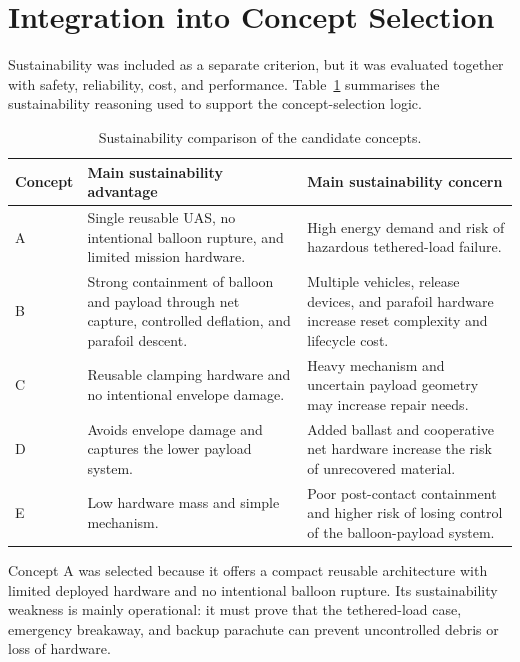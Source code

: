 \section{Integration into Concept Selection}

Sustainability was included as a separate criterion, but it was evaluated together with safety, reliability, cost, and performance. %
Table~\ref{tab:sustainability_concept_comparison} summarises the sustainability reasoning used to support the concept-selection logic.

\begin{table}[H]
\centering
\footnotesize
\caption{Sustainability comparison of the candidate concepts.}
\label{tab:sustainability_concept_comparison}
\renewcommand{\arraystretch}{1.2}
\setlength{\tabcolsep}{4pt}
\begin{tabularx}{\textwidth}{@{}p{}X X@{}}
\toprule
\textbf{Concept} & \textbf{Main sustainability advantage} & \textbf{Main sustainability concern} \\
\midrule
A 
& Single reusable UAS, no intentional balloon rupture, and limited mission hardware. 
& High energy demand and risk of hazardous tethered-load failure. \\

B 
& Strong containment of balloon and payload through net capture, controlled deflation, and parafoil descent. 
& Multiple vehicles, release devices, and parafoil hardware increase reset complexity and lifecycle cost. \\

C 
& Reusable clamping hardware and no intentional envelope damage. 
& Heavy mechanism and uncertain payload geometry may increase repair needs. \\

D 
& Avoids envelope damage and captures the lower payload system. 
& Added ballast and cooperative net hardware increase the risk of unrecovered material. \\

E 
& Low hardware mass and simple mechanism. 
& Poor post-contact containment and higher risk of losing control of the balloon-payload system. \\
\bottomrule
\end{tabularx}
\end{table}

Concept A was selected because it offers a compact reusable architecture with limited deployed hardware and no intentional balloon rupture. Its sustainability weakness is mainly operational: it must prove that the tethered-load case, emergency breakaway, and backup parachute can prevent uncontrolled debris or loss of hardware.

